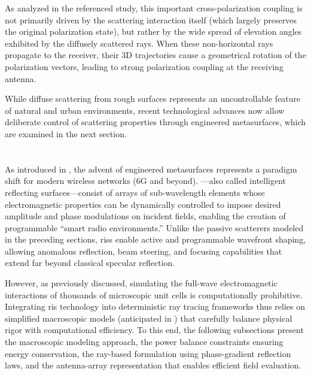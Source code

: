 As analyzed in the referenced study, this important cross-polarization coupling is not primarily driven by the scattering interaction itself (which largely preserves the original polarization state), but rather by the wide spread of elevation angles exhibited by the diffusely scattered rays. When these non-horizontal rays propagate to the receiver, their 3D trajectories cause a geometrical rotation of the polarization vectors, leading to strong polarization coupling at the receiving antenna.

While diffuse scattering from rough surfaces represents an uncontrollable feature of natural and urban environments, recent technological advances now allow deliberate control of scattering properties through engineered metasurfaces, which are examined in the next section.

\section{\texorpdfstring{}{Reconfigurable Intelligent Surfaces}}

As introduced in , the advent of engineered metasurfaces represents a paradigm shift for modern wireless networks (6G and beyond). ---also called intelligent reflecting surfaces---consist of arrays of sub-\gls{wavelength} elements whose electromagnetic properties can be dynamically controlled to impose desired amplitude and phase modulations on incident fields, enabling the creation of programmable \enquote{smart radio environments.} Unlike the passive scatterers modeled in the preceding sections, \glspl{ris} enable active and programmable wavefront shaping, allowing anomalous reflection, beam steering, and focusing capabilities that extend far beyond classical specular reflection.

However, as previously discussed, simulating the full-wave electromagnetic interactions of thousands of microscopic unit cells is computationally prohibitive. Integrating \gls{ris} technology into deterministic ray tracing frameworks thus relies on simplified macroscopic models (anticipated in ) that carefully balance physical rigor with computational efficiency. To this end, the following subsections present the macroscopic modeling approach, the power balance constraints ensuring energy conservation, the ray-based formulation using phase-gradient reflection laws, and the antenna-array representation that enables efficient field evaluation.

